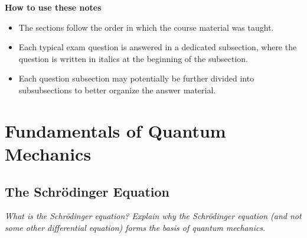 \documentclass[11pt, a4paper]{article}
\newcommand{\Schro}{Schr\"{o}dinger\xspace}
\begin{document}
\vspace{5mm}
\textbf{How to use these notes}
\begin{itemize}
    \item The sections follow the order in which the course material was taught.

    \item Each typical exam question is answered in a dedicated subsection, where the question is written in italics at the beginning of the subsection.
    
    \item Each question subsection may potentially be further divided into subsubsections to better organize the answer material.

\end{itemize}

\newpage

\pagestyle{empty}  %
\tableofcontents

\newpage

\pagestyle{fancy}  %

\section{Fundamentals of Quantum Mechanics}
\subsection{The \Schro Equation}
\textit{What is the \Schro equation? Explain why the \Schro equation (and not some other differential equation) forms the basis of quantum mechanics.}
\end{document}
